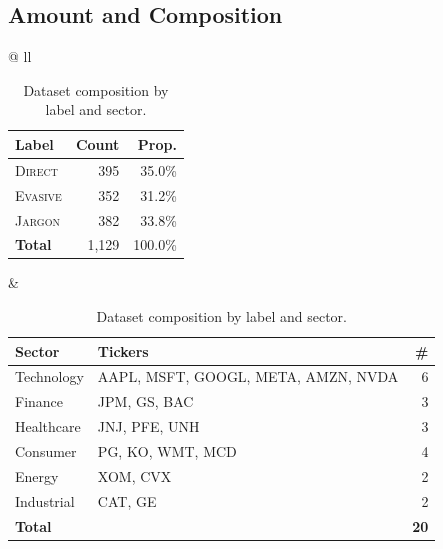 \documentclass[12pt]{article}
\begin{document}
\subsection{Amount and Composition}

\begin{table}[htbp]
\centering
\caption{Dataset composition by label and sector.}
\label{tab:composition}
\begin{tabular*}{\linewidth}{@{\extracolsep{\fill}} ll}
  \begin{minipage}[t]{0.42\linewidth}
    \centering
    \small
    \begin{tabular}{lrr}
      \toprule
      \textbf{Label} & \textbf{Count} & \textbf{Prop.} \\
      \midrule
      \textsc{Direct}  & 395 & 35.0\% \\
      \textsc{Evasive} & 352 & 31.2\% \\
      \textsc{Jargon}  & 382 & 33.8\% \\
      \midrule
      \textbf{Total}   & 1{,}129 & 100.0\% \\
      \bottomrule
    \end{tabular}
    \label{tab:class_dist}
  \end{minipage}
  &
  \begin{minipage}[t]{0.54\linewidth}
    \centering
    \footnotesize
    \begin{tabular}{l p{5.1cm} r}
      \toprule
      \textbf{Sector} & \textbf{Tickers} & \textbf{\#} \\
      \midrule
      Technology  & AAPL, MSFT, GOOGL, META, AMZN, NVDA & 6 \\
      Finance     & JPM, GS, BAC          & 3 \\
      Healthcare  & JNJ, PFE, UNH         & 3 \\
      Consumer    & PG, KO, WMT, MCD      & 4 \\
      Energy      & XOM, CVX              & 2 \\
      Industrial  & CAT, GE               & 2 \\
      \midrule
      \textbf{Total} & & \textbf{20} \\
      \bottomrule
    \end{tabular}
  \end{minipage}
\end{tabular*}
\end{table}
\end{document}
